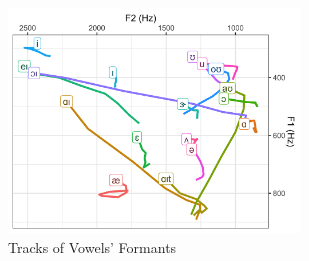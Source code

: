 \documentclass{../labbook}
\begin{document}
    \begin{figure}[h!]
        \centering
        \includegraphics[width=0.69\textwidth]{Cantao Su_Track of Vowel's Formants.jpg}
        \caption{Tracks of Vowels' Formants}
	\end{figure}

    
\end{document}
